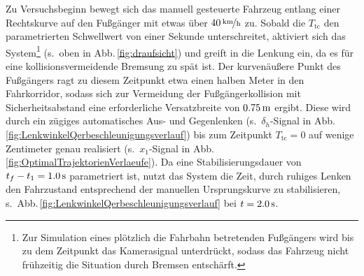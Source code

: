 Zu Versuchsbeginn bewegt sich das manuell gesteuerte Fahrzeug entlang einer Rechtskurve auf den Fußgänger mit etwas über $\unitfrac[40]{km}{h}$ zu. Sobald die $T_\text{tc}$ den parametrierten Schwellwert von einer Sekunde unterschreitet, aktiviert sich das System\footnote{Zur Simulation eines plötzlich die Fahrbahn betretenden Fußgängers wird bis zu dem Zeitpunkt das Kamerasignal unterdrückt, sodass das Fahrzeug nicht frühzeitig die Situation durch Bremsen entschärft.} (s.\ oben in Abb.\,\ref{fig:draufsicht}) und greift in die Lenkung ein, da es für eine kollisionsvermeidende Bremsung zu spät ist. Der kurvenäußere Punkt des Fußgängers ragt zu diesem Zeitpunkt etwa einen halben Meter in den Fahrkorridor, sodass sich zur Vermeidung der Fußgängerkollision mit Sicherheitsabstand eine erforderliche Versatzbreite von $\unit[0.75]{m}$ ergibt. Diese wird durch ein zügiges automatisches Aus- und Gegenlenken (s.\ $\delta_h$-Signal in Abb.\,\ref{fig:LenkwinkelQerbeschleunigungsverlauf}) bis zum Zeitpunkt $T_\text{tc}=0$ auf wenige Zentimeter genau realisiert (s.\ $x_1$-Signal in Abb.\,\ref{fig:OptimalTrajektorienVerlaeufe}). Da eine Stabilisierungsdauer von $t_f- t_1 = \unit[1.0]{s}$ parametriert ist, nutzt das System die Zeit, durch ruhiges Lenken den Fahrzustand entsprechend der manuellen Ursprungskurve zu stabilisieren, s.\ Abb.\,\ref{fig:LenkwinkelQerbeschleunigungsverlauf} bei $t=\unit[2.0]{s}$.


